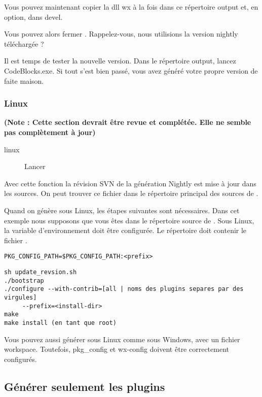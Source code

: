 Vous pouvez maintenant copier la dll wx à la fois dans ce répertoire output et, en option, dans devel.

Vous pouvez alors fermer \codeblocks. Rappelez-vous, nous utilisions la version nightly téléchargée ?

Il est temps de tester la nouvelle version. Dans le répertoire output, lancez CodeBlocks.exe. Si tout s'est bien passé, vous avez généré votre propre version de \codeblocks faite maison.

\subsubsection{Linux}

\textbf{(Note : Cette section devrait être revue et complétée. Elle ne semble pas complètement à jour)}

\begin{description}
\item[linux] Lancer 
\end{description}

Avec cette fonction la révision SVN de la génération Nightly est mise à jour dans les sources. On peut trouver ce fichier dans le répertoire principal des sources de \codeblocks.

Quand on génère sous Linux, les étapes suivantes sont nécessaires. Dans cet exemple nous supposons que vous êtes dans le répertoire source de \codeblocks.  Sous Linux, la variable d'environnement  doit être configurée. Le répertoire  doit contenir le fichier . 

\begin{verbatim}
PKG_CONFIG_PATH=$PKG_CONFIG_PATH:<prefix>
\end{verbatim}


\begin{verbatim}
sh update_revsion.sh
./bootstrap
./configure --with-contrib=[all | noms des plugins separes par des virgules]
     --prefix=<install-dir>
make
make install (en tant que root)
\end{verbatim}

Vous pouvez aussi générer sous Linux comme sous Windows, avec un fichier workspace. Toutefois, pkg\_config et wx-config doivent être correctement configurés.

\subsection{Générer seulement les plugins}

